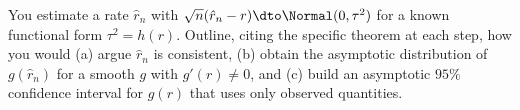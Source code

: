 \begin{exercise}
\label{ch22:exr-synthesis}
You estimate a rate $\hat r_n$ with $\sqrt n(\hat r_n - r)\dto\Normal(0,\tau^2)$ for a
known functional form $\tau^2=h(r)$. Outline, citing the specific theorem at each step,
how you would (a) argue $\hat r_n$ is consistent, (b) obtain the asymptotic
distribution of $g(\hat r_n)$ for a smooth $g$ with $g'(r)\ne0$, and (c) build an
asymptotic $95\%$ confidence interval for $g(r)$ that uses only observed quantities.
\end{exercise}
